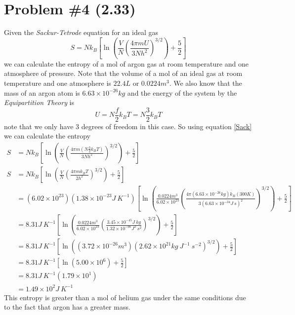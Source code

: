 \documentclass[11pt]{article}
\numberwithin{equation}{section}
\begin{document}
\section{Problem \#4 (2.33)}
Given the \emph{Sackur-Tetrode} equation for an ideal gas
\begin{equation}
S = Nk_B\left[\ln\left(\frac{V}{N}\left(\frac{4\pi mU}{3Nh^2}\right)^{3/2}\right)+\frac{5}{2}\right]
\label{Sack}
\end{equation}
we can calculate the entropy of a mol of argon gas at room temperature and one atmosphere of pressure. Note that the volume of a mol of an ideal gas at room temperature and one atmosphere is $22.4\unit{L}$ or $0.0224\unit{m^3}$. We also know that the mass of an argon atom is $6.63\times10^{-26}\unit{kg}$ and the energy of the system by the \emph{Equipartition Theory} is
$$U = N\frac{f}{2}k_BT =  N\frac{3}{2}k_BT $$
note that we only have 3 degrees of freedom in this case. So using equation \ref{Sack} we can calculate the entropy 
\begin{align*}
S &= Nk_B\left[\ln\left(\frac{V}{N}\left(\frac{4\pi m(N\frac{3}{2}k_BT)}{3Nh^2}\right)^{3/2}\right)+\frac{5}{2}\right]\\
S &= Nk_B\left[\ln\left(\frac{V}{N}\left(\frac{4\pi mk_BT}{2h^2}\right)^{3/2}\right)+\frac{5}{2}\right]\\
&= (6.02\times10^{23})(1.38\times10^{-23}\unit{J\ K^{-1}})\left[\ln\left(\frac{0.0224\unit{m^3}}{6.02\times10^{23}}\left(\frac{4\pi (6.63\times10^{-26}\unit{kg})k_B(300\unit{K})}{3(6.63\times10^{-34}\unit{J\ s})^2}\right)^{3/2}\right)+\frac{5}{2}\right]\\
&= 8.31\unit{J\ K^{-1}}\left[\ln\left(\frac{0.0224\unit{m^3}}{6.02\times10^{23}}\left(\frac{3.45\times10^{-45}\unit{J\ kg}}{1.32\times10^{-66}\unit{J^2\ s^2}}\right)^{3/2}\right)+\frac{5}{2}\right]\\
&= 8.31\unit{J\ K^{-1}}\left[\ln\left((3.72\times10^{-26}\unit{m^3})\left(2.62\times10^{21}\unit{kg\ J^{-1}\ s^{-2}}\right)^{3/2}\right)+\frac{5}{2}\right]\\
&= 8.31\unit{J\ K^{-1}}\left[\ln\left(5.00\times10^{6}\right)+\frac{5}{2}\right]\\
&= 8.31\unit{J\ K^{-1}}\left(1.79\times10^{1}\right)\\
&= 1.49\times10^{2}\unit{J\ K^{-1}}
\end{align*}
This entropy is greater than a mol of helium gas under the same conditions due to the fact that argon has a greater mass.
\end{document}
